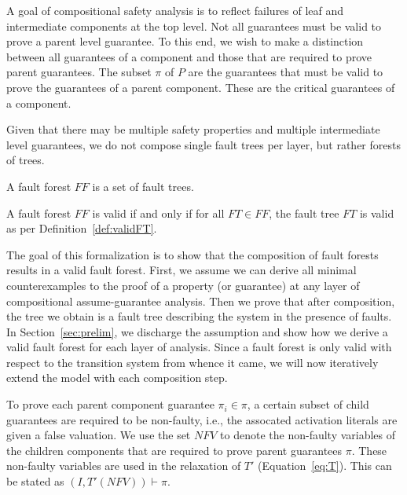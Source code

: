 A goal of compositional safety analysis is to reflect failures of leaf and intermediate components at the top level. Not all guarantees must be valid to prove a parent level guarantee. To this end, we wish to make a distinction between all guarantees of a component and those that are required to prove parent guarantees. The subset $\pi$ of $P$ are the guarantees that must be valid to prove the guarantees of a parent component. These are the critical guarantees of a component.

Given that there may be multiple safety properties and multiple intermediate level guarantees, we do not compose single fault trees per layer, but rather forests of trees.

\begin{definition}
A fault forest $\mathit{FF}$ is a set of fault trees.
\end{definition}

\begin{definition}
A fault forest $\mathit{FF}$ is valid if and only if for all $ \mathit{FT} \in \mathit{FF}$, the fault tree $\mathit{FT}$ is valid as per Definition~\ref{def:validFT}.
\label{def:validFF}
\end{definition}

The goal of this formalization is to show that the composition of fault forests results in a valid fault forest. First, we assume we can derive all minimal counterexamples to the proof of a property (or guarantee) at any layer of compositional assume-guarantee analysis. Then we prove that after composition, the tree we obtain is a fault tree describing the system in the presence of faults. In Section~\ref{sec:prelim}, we discharge the assumption and show how we derive a valid fault forest for each layer of analysis. Since a fault forest is only valid with respect to the transition system from whence it came, we will now iteratively extend the model with each composition step. 



To prove each parent component guarantee $\pi_i \in \pi$, a certain subset of child guarantees are required to be non-faulty, i.e., the assocated activation literals are given a false valuation. We use the set $\mathit{NFV}$ to denote the non-faulty variables of the children components that are required to prove parent guarantees $\pi$.  These non-faulty variables are used in the relaxation of $T'$ (Equation~\ref{eq:T}). This can be stated as $(I,T'(\mathit{NFV})) \vdash \pi$. 


